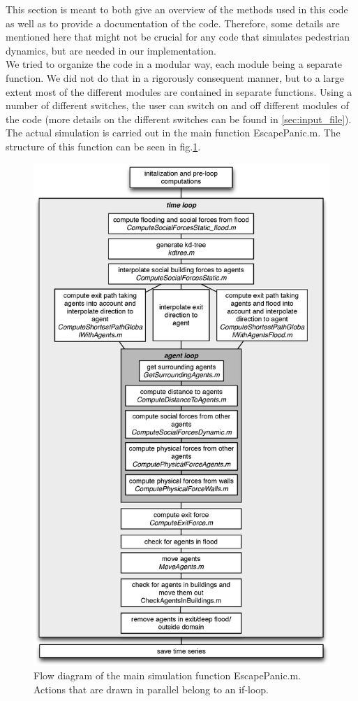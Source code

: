 \documentclass[11pt]{article}
\begin{document}
This section is meant to both give an overview of the methods used in this code as well as to provide a documentation of the code. Therefore, some details are mentioned here that might not be crucial for any code that simulates pedestrian dynamics, but are needed in our implementation.\\
We tried to organize the code in a modular way, each module being a separate function. We did not do that in a rigorously consequent manner, but to a large extent most of the different modules are contained in separate functions. Using a number of different switches, the user can switch on and off different modules of the code (more details on the different switches can be found in \ref{sec:input_file}).\\
The actual simulation is carried out in the main function EscapePanic.m. The structure of this function can be seen in fig.\ref{fig:EscapePanic}. 
\begin{figure}
\centering
\includegraphics[height=0.8\textheight]{figures/EscapePanic}
\caption{Flow diagram of the main simulation function EscapePanic.m. Actions that are drawn in parallel belong to an if-loop.}
\label{fig:EscapePanic}
\end{figure}
\end{document}
